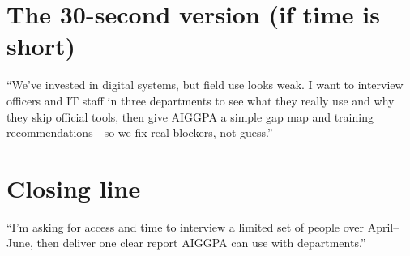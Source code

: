 \documentclass[12pt,a4paper]{article}
\begin{document}
\section*{The 30-second version (if time is short)}
``We've invested in digital systems, but field use looks weak. I want to interview officers and IT staff in three departments to see what they really use and why they skip official tools, then give AIGGPA a simple gap map and training recommendations---so we fix real blockers, not guess.''

\section*{Closing line}
``I'm asking for access and time to interview a limited set of people over April--June, then deliver one clear report AIGGPA can use with departments.''
\end{document}
